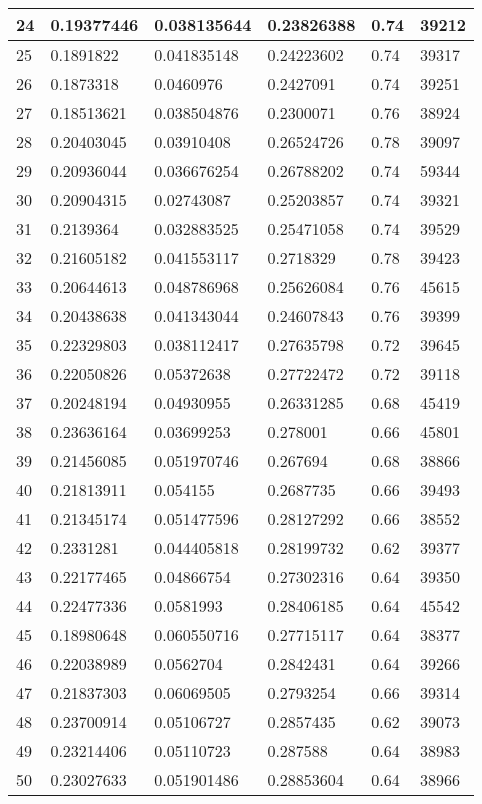 \begin{longtable}{|l|l|l|l|l|l|}
24 & 0.19377446 & 0.038135644 & 0.23826388 & 0.74 & 39212 \\ \hline 
25 & 0.1891822 & 0.041835148 & 0.24223602 & 0.74 & 39317 \\ \hline 
26 & 0.1873318 & 0.0460976 & 0.2427091 & 0.74 & 39251 \\ \hline 
27 & 0.18513621 & 0.038504876 & 0.2300071 & 0.76 & 38924 \\ \hline 
28 & 0.20403045 & 0.03910408 & 0.26524726 & 0.78 & 39097 \\ \hline 
29 & 0.20936044 & 0.036676254 & 0.26788202 & 0.74 & 59344 \\ \hline 
30 & 0.20904315 & 0.02743087 & 0.25203857 & 0.74 & 39321 \\ \hline 
31 & 0.2139364 & 0.032883525 & 0.25471058 & 0.74 & 39529 \\ \hline 
32 & 0.21605182 & 0.041553117 & 0.2718329 & 0.78 & 39423 \\ \hline 
33 & 0.20644613 & 0.048786968 & 0.25626084 & 0.76 & 45615 \\ \hline 
34 & 0.20438638 & 0.041343044 & 0.24607843 & 0.76 & 39399 \\ \hline 
35 & 0.22329803 & 0.038112417 & 0.27635798 & 0.72 & 39645 \\ \hline 
36 & 0.22050826 & 0.05372638 & 0.27722472 & 0.72 & 39118 \\ \hline 
37 & 0.20248194 & 0.04930955 & 0.26331285 & 0.68 & 45419 \\ \hline 
38 & 0.23636164 & 0.03699253 & 0.278001 & 0.66 & 45801 \\ \hline 
39 & 0.21456085 & 0.051970746 & 0.267694 & 0.68 & 38866 \\ \hline 
40 & 0.21813911 & 0.054155 & 0.2687735 & 0.66 & 39493 \\ \hline 
41 & 0.21345174 & 0.051477596 & 0.28127292 & 0.66 & 38552 \\ \hline 
42 & 0.2331281 & 0.044405818 & 0.28199732 & 0.62 & 39377 \\ \hline 
43 & 0.22177465 & 0.04866754 & 0.27302316 & 0.64 & 39350 \\ \hline 
44 & 0.22477336 & 0.0581993 & 0.28406185 & 0.64 & 45542 \\ \hline 
45 & 0.18980648 & 0.060550716 & 0.27715117 & 0.64 & 38377 \\ \hline 
46 & 0.22038989 & 0.0562704 & 0.2842431 & 0.64 & 39266 \\ \hline 
47 & 0.21837303 & 0.06069505 & 0.2793254 & 0.66 & 39314 \\ \hline 
48 & 0.23700914 & 0.05106727 & 0.2857435 & 0.62 & 39073 \\ \hline 
49 & 0.23214406 & 0.05110723 & 0.287588 & 0.64 & 38983 \\ \hline 
50 & 0.23027633 & 0.051901486 & 0.28853604 & 0.64 & 38966 \\ \hline 
\end{longtable}